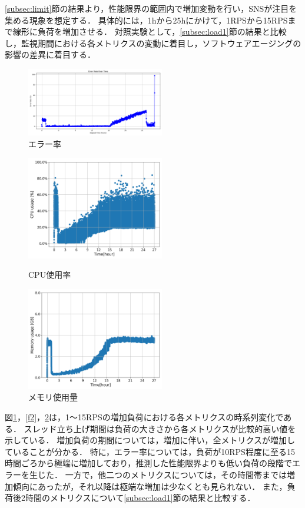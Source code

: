 \documentclass[twoside,twocolumn,10pt]{jarticle}  %
\begin{document}
\ref{subsec:limit}節の結果より，性能限界の範囲内で増加変動を行い，SNSが注目を集める現象を想定する．
具体的には，1hから25hにかけて，1RPSから15RPSまで線形に負荷を増加させる．
対照実験として，\ref{subsec:load1}節の結果と比較し，監視期間における各メトリクスの変動に着目し，ソフトウェアエージングの影響の差異に着目する．
\begin{figure}[H]
  \centering
  \includegraphics[scale=0.1,width=60mm]{figures/8core_1_15rps_error_rate.png}
  \caption{エラー率}
  \label{f1}
\end{figure}
\begin{figure}[H]
  \centering
  \includegraphics[scale=0.1,width=60mm]{figures/8core_1_15rps_increase_cpu.png}
  \caption{CPU使用率}
  \label{f2}
  \centering
  \includegraphics[scale=0.1,width=60mm]{figures/8core_1_15rps_increase_mem.png}
  \caption{メモリ使用量}
  \label{f3}
\end{figure}

図\ref{f1}，\ref{f2}，\ref{f3}は，1～15RPSの増加負荷における各メトリクスの時系列変化である．
スレッド立ち上げ期間は負荷の大きさから各メトリクスが比較的高い値を示している．
増加負荷の期間については，増加に伴い，全メトリクスが増加していることが分かる．
特に，エラー率については，負荷が10RPS程度に至る15時間ごろから極端に増加しており，推測した性能限界よりも低い負荷の段階でエラーを生じた．
一方で，他二つのメトリクスについては，その時間帯までは増加傾向にあったが，それ以降は極端な増加は少なくとも見られない．
また，負荷後2時間のメトリクスについて\ref{subsec:load1}節の結果と比較する．
\end{document}
